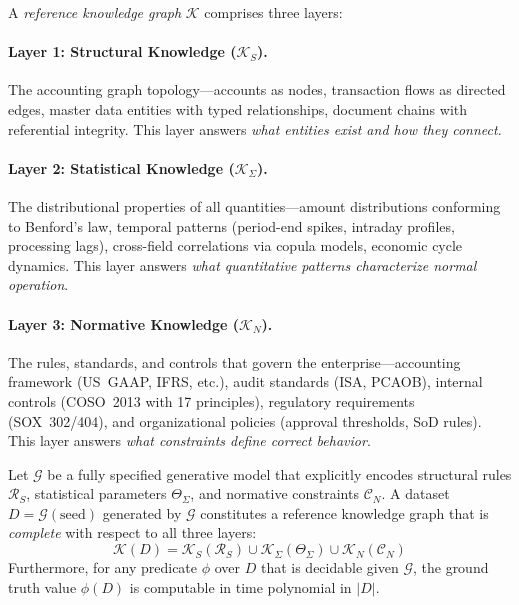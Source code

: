 \begin{definition}
\label{def:three_layers}
A \emph{reference knowledge graph} $\mathcal{K}$ comprises three layers:

\paragraph{Layer 1: Structural Knowledge ($\mathcal{K}_S$).}
The accounting graph topology---accounts as nodes, transaction flows as
directed edges, master data entities with typed relationships, document
chains with referential integrity.  This layer answers \emph{what
entities exist and how they connect}.

\paragraph{Layer 2: Statistical Knowledge ($\mathcal{K}_\Sigma$).}
The distributional properties of all quantities---amount distributions
conforming to Benford's law, temporal patterns (period-end spikes,
intraday profiles, processing lags), cross-field correlations via copula
models, economic cycle dynamics.  This layer answers \emph{what
quantitative patterns characterize normal operation}.

\paragraph{Layer 3: Normative Knowledge ($\mathcal{K}_N$).}
The rules, standards, and controls that govern the enterprise---accounting
framework (US~GAAP, IFRS, etc.), audit standards (ISA, PCAOB), internal
controls (COSO~2013 with 17 principles), regulatory requirements (SOX~302/404),
and organizational policies (approval thresholds, SoD rules).  This layer
answers \emph{what constraints define correct behavior}.
\end{definition}

\begin{proposition}
\label{thm:completeness}
Let $\mathcal{G}$ be a fully specified generative model that explicitly
encodes structural rules $\mathcal{R}_S$, statistical parameters
$\Theta_\Sigma$, and normative constraints $\mathcal{C}_N$.  A dataset
$D = \mathcal{G}(\text{seed})$ generated by $\mathcal{G}$ constitutes a
reference knowledge graph that is \emph{complete} with respect to all
three layers:
\begin{equation}
\mathcal{K}(D) = \mathcal{K}_S(\mathcal{R}_S)
  \cup \mathcal{K}_\Sigma(\Theta_\Sigma)
  \cup \mathcal{K}_N(\mathcal{C}_N)
\label{eq:completeness}
\end{equation}
Furthermore, for any predicate $\phi$ over $D$ that is decidable given
$\mathcal{G}$, the ground truth value $\phi(D)$ is computable in time
polynomial in $|D|$.
\end{proposition}

